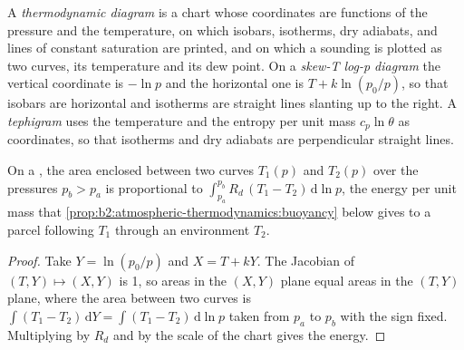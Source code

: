 \begin{definition}\label{def:b2:atmospheric-thermodynamics:diagram}
A \emph{thermodynamic diagram} is a chart whose coordinates are
functions of the pressure and the temperature, on which isobars, isotherms, dry adiabats,  and lines of constant saturation  are printed, and on which a sounding is
plotted as two curves, its temperature and its dew point. On a \emph{skew-T log-p
diagram} the vertical coordinate is $-\ln p$ and the horizontal one is
$T + k\ln(p_0/p)$, so that isobars are horizontal and isotherms are straight lines slanting up to
the right. A \emph{tephigram} uses the temperature and the entropy per unit
mass $c_p\ln\theta$ as coordinates, so that isotherms and dry adiabats are perpendicular straight
lines.
\end{definition}

\begin{proposition}\label{prop:b2:atmospheric-thermodynamics:areas}
On a , the area enclosed between two curves $T_1(p)$ and $T_2(p)$ over the
pressures $p_b > p_a$ is proportional to $\int_{p_a}^{p_b} R_d\,(T_1 - T_2)\,\mathrm{d}\ln p$,
the energy per unit mass that \cref{prop:b2:atmospheric-thermodynamics:buoyancy} below gives to
a parcel following $T_1$ through an environment $T_2$.
\end{proposition}

\begin{proof}
Take $Y = \ln(p_0/p)$ and $X = T + kY$. The Jacobian of $(T, Y) \mapsto (X, Y)$ is 1, so areas in
the $(X, Y)$ plane equal areas in the $(T, Y)$ plane, where the area between two curves is
$\int (T_1 - T_2)\,\mathrm{d}Y = \int (T_1 - T_2)\,\mathrm{d}\ln p$ taken from $p_a$ to $p_b$
with the sign fixed. Multiplying by $R_d$ and by the scale of the chart gives the energy.
\end{proof}

